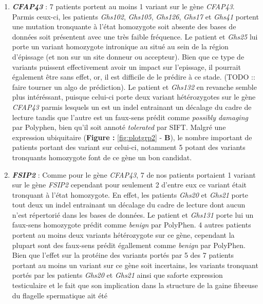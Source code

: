 \documentclass[12pt,twoside]{reedthesis}
\theoremstyle{definition}
\theoremstyle{definition}
\theoremstyle{remark}
\begin{document}
  \begin{enumerate}
  \def\labelenumi{\arabic{enumi}.}
  \item
    \textbf{\emph{CFAP43}} : 7 patients portent au moins 1 variant sur le
    gène \emph{CFAP43}. Parmis ceux-ci, les patients \emph{Ghs102},
    \emph{Ghs105}, \emph{Ghs126}, \emph{Ghs17} et \emph{Ghs41} portent une
    mutation tronquante à l'état homozygote soit absente des bases de
    données soit présentent avec une très faible fréquence. Le patient et
    \emph{Ghs25} lui porte un variant homozygote intronique au situé au
    sein de la région d'épissage (et non sur un site donneur ou
    accepteur). Bien que ce type de variants puissent effectivement avoir
    un impact sur l'epissage, il pourrait également être sans effet, or,
    il est difficile de le prédire à ce stade. (TODO :: faire tourner un
    algo de prédiction). Le patient et \emph{Ghs132} en revanche semble
    plus intéréssant, puisque celui-ci porte deux variant hétérozygotes
    sur le gène \emph{CFAP43} parmis lesquels un est un indel entrainant
    un décalage du cadre de lecture tandis que l'autre est un faux-sens
    prédit comme \emph{possibly damaging} par Polyphen, bien qu'il soit
    annoté \emph{tolerated} par SIFT. Malgré une expression ubiquitaire
    (\textbf{Figure : }\ref{fig:plotgrp2} - \textbf{B}), le nombre
    important de patients portant des variant sur celui-ci, notamment 5
    potant des variants tronquants homozygote font de ce gène un bon
    candidat.
  \item
    \textbf{\emph{FSIP2}} : Comme pour le gène \emph{CFAP43}, 7 de nos
    patients portaient 1 variant sur le gène \emph{FSIP2} cependant pour
    seulement 2 d'entre eux ce variant était tronquant à l'état
    homozygote. En effet, les patients \emph{Ghs20} et \emph{Ghs21} porte
    tout deux un indel entrainant un décalage du cadre de lecture dont
    aucun n'est répertorié dans les bases de données. Le patient et
    \emph{Ghs131} porte lui un faux-sens homozygote prédit comme
    \emph{benign} par PolyPhen. 4 autres patients portent au moins deux
    variants hétérozygote sur ce gène, cependant la plupart sont des
    faux-sens prédit égallement comme \emph{benign} par PolyPhen. Bien que
    l'effet sur la protéine des variants portés par 5 des 7 patients
    portant au moins un variant sur ce gène soit incertains, les variants
    tronquant portés par les patients \emph{Ghs20} et \emph{Ghs21} ainsi
    que saforte expression testiculaire et le fait que son implication
    dans la structure de la gaine fibreuse du flagelle spermatique ait été

\end{enumerate}
\end{document}
